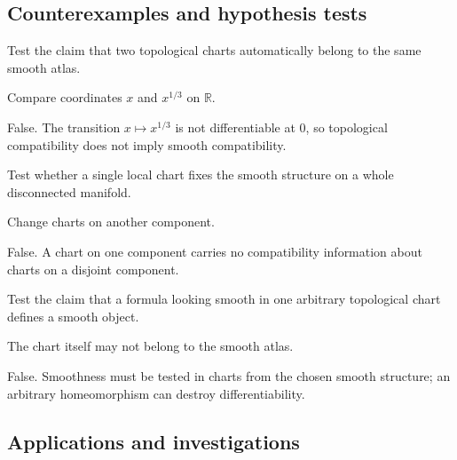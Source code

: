 \subsection*{Counterexamples and hypothesis tests}

\begin{exercise}\label{exr:vii02-ped-10}
Test the claim that two topological charts automatically belong to the same smooth atlas.
\end{exercise}
\begin{hint}
Compare coordinates \(x\) and \(x^{1/3}\) on \(\mathbb R\).
\end{hint}
\begin{solution}
False.  The transition \(x\mapsto x^{1/3}\) is not differentiable at \(0\), so topological compatibility does not imply smooth compatibility.
\end{solution}

\begin{exercise}\label{exr:vii02-ped-11}
Test whether a single local chart fixes the smooth structure on a whole disconnected manifold.
\end{exercise}
\begin{hint}
Change charts on another component.
\end{hint}
\begin{solution}
False.  A chart on one component carries no compatibility information about charts on a disjoint component.
\end{solution}

\begin{exercise}\label{exr:vii02-ped-12}
Test the claim that a formula looking smooth in one arbitrary topological chart defines a smooth object.
\end{exercise}
\begin{hint}
The chart itself may not belong to the smooth atlas.
\end{hint}
\begin{solution}
False.  Smoothness must be tested in charts from the chosen smooth structure; an arbitrary homeomorphism can destroy differentiability.
\end{solution}

\subsection*{Applications and investigations}

